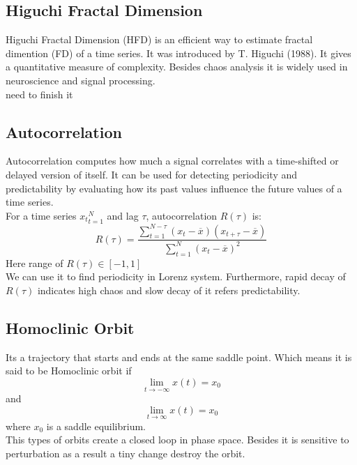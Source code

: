 \documentclass[%
reprint,
amsmath,amssymb,
aps,
floatfix,
]{revtex4-2}
\begin{document}
	\subsection{Higuchi Fractal Dimension}
	Higuchi Fractal Dimension (HFD) is an efficient way to estimate fractal dimention (FD)\cite{mandelbrot1982fractal} of a time series. It was introduced by T. Higuchi (1988). It gives a quantitative measure of complexity. Besides chaos analysis it is widely used in neuroscience and signal processing.\\
	need to finish it
	\subsection{Autocorrelation}
	Autocorrelation computes how much a signal correlates with a time-shifted or delayed version of  itself. It can be used for detecting periodicity and predictability by evaluating how its past values influence the future values of a time series.\\
	For a time series ${x_t}_{t=1}^N$ and lag $\tau$, autocorrelation $R(\tau)$ is:
	\begin{equation}
		R(\tau) = \frac{\sum_{t=1}^{N-\tau} (x_t - \overline{x}) (x_{t+\tau} - \overline{x})}{\sum_{t=1}^{N} (x_t - \overline{x})^2}
	\end{equation}
	Here range of $R(\tau) \in [-1,1]$ \\
	We can use it to find periodicity in Lorenz system. Furthermore, rapid decay of $R(\tau)$ indicates high chaos and slow decay of it refers predictability.\\
	\subsection{Homoclinic Orbit}
	Its a trajectory that starts and ends at the same saddle point.
	Which means it is said to be Homoclinic orbit if\\
	\begin{equation}
		\lim_{t\to -\infty} x(t) = x_0
	\end{equation}
	and
	\begin{equation}
		\lim_{t\to \infty} x(t) = x_0
	\end{equation}
	where $x_0$ is a saddle equilibrium.\\
	This types of orbits create a closed loop in phase space. Besides it is sensitive to perturbation as a result a tiny change destroy the orbit.
\end{document}
